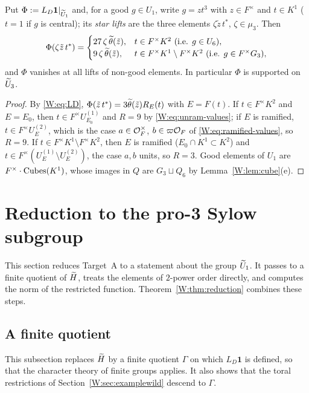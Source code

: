\begin{lemma}\label{W:lem:Phi}
Put $\Phi:=L_D\mathbf1|_{\widetilde U_1}$ and, for a good $g\in U_1$, write
$g=zt^3$ with $z\in F^\times$ and $t\in K^1$ ($t=1$ if $g$ is central);
its \emph{star lifts} are the three elements $\zeta\tilde z\,t^*$,
$\zeta\in\mu_3$.  Then
\begin{equation}\label{W:eq:Phivalues}
 \Phi(\zeta\tilde z\,t^*)=\begin{cases}
 27\,\zeta\,\tth(\tilde z),& t\in F^\times K^2\ (\text{i.e. } g\in U_6),\\
 9\,\zeta\,\tth(\tilde z),& t\in F^\times K^1\setminus F^\times K^2\ (\text{i.e. } g\in F^\times G_3),
 \end{cases}
\end{equation}
and $\Phi$ vanishes at all lifts of non-good elements.  In particular
$\Phi$ is supported on $\widetilde U_3$.
\end{lemma}
\begin{proof}
By \eqref{W:eq:LD}, $\Phi(\tilde z\,t^*)=3\widetilde\theta(\tilde z)R_E(t)$ with
$E=F(t)$.  If $t\in F^\times K^2$ and $E=E_0$, then $t\in F^\times U^{(1)}_{E_0}$
and $R=9$ by \eqref{W:eq:unram-values}; if $E$ is ramified, $t\in F^\times U^{(2)}_E$,
which is the case $a\in\mathcal O_F^\times$, $b\in\varpi\mathcal O_F$ of
\eqref{W:eq:ramified-values}, so $R=9$.  If $t\in F^\times K^1\setminus F^\times K^2$,
then $E$ is ramified ($E_0\cap K^1\subset K^2$) and $t\in F^\times(U^{(1)}_E\setminus U^{(2)}_E)$,
the case $a,b$ units, so $R=3$.  Good elements of $U_1$ are
$F^\times\cdot\mathrm{Cubes}(K^1)$, whose images in $Q$ are $G_3\sqcup Q_6$ by
Lemma~\ref{W:lem:cube}(e).
\end{proof}

\section{Reduction to the pro-3 Sylow subgroup}\label{W:sec:reduction}
This section reduces Target~A to a statement about the group $\widetilde U_1$. It passes to a finite quotient of $\widetilde H$, treats the elements of $2$-power order directly, and computes the norm of the restricted function. Theorem~\ref{W:thm:reduction} combines these steps.

\subsection{A finite quotient}
This subsection replaces $\widetilde H$ by a finite quotient $\Gamma$ on which $L_D\mathbf1$ is defined, so that the character theory of finite groups applies. It also shows that the toral restrictions of Section~\ref{W:sec:examplewild} descend to $\Gamma$.

